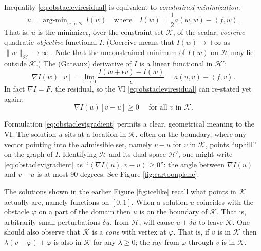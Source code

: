 \documentclass[letterpaper,final,12pt,reqno]{amsart}
\theoremstyle{claim}
\newcommand{\eps}{\epsilon}
\newcommand{\grad}{\nabla}
\newcommand{\ip}[2]{\left<#1,#2\right>}
\numberwithin{equation}{section}
\numberwithin{figure}{section}
\numberwithin{table}{section}
\numberwithin{theorem}{section}
\begin{document}
Inequality \eqref{eq:obstacleviresidual} is equivalent to \emph{constrained minimization}:
\newcommand{\argmin}{\mathop{\mathrm{arg\text{-}min}}}
\begin{equation}
  u = \argmin_{w \text{ in } \mathcal{K}} I(w) \quad \text{where} \quad I(w) = \frac{1}{2} a(w,w) - \ip{f}{w}. \label{eq:obstaclemin}
\end{equation}
That is, $u$ is the minimizer, over the constraint set $\mathcal{K}$, of the scalar, \emph{coercive} quadratic \emph{objective} functional $I$.  (Coercive means that $I(w) \to +\infty$ as $\|w\|_{\mathcal{H}} \to \infty$ \cite{Evans2010}.  Note that the unconstrained minimum of $I(w)$ on $\mathcal{H}$ may lie outside $\mathcal{K}$.)  The (Gateaux) derivative of $I$ is a linear functional in $\mathcal{H}'$:
\begin{equation}
  \grad I(w)[v] = \lim_{\eps\to 0} \frac{I(w+\eps v) - I(w)}{\eps} = a(u,v) - \ip{f}{v}.  \label{eq:gradobjective}
\end{equation}
In fact $\nabla I = F$, the residual, so the VI \eqref{eq:obstacleviresidual} can re-stated yet again:
\begin{equation}
  \nabla I(u)[v-u] \ge 0 \quad \text{ for all } v \text{ in } \mathcal{K}. \label{eq:obstaclevigradient}
\end{equation}

Formulation \eqref{eq:obstaclevigradient} permits a clear, geometrical meaning to the VI.  The solution $u$ sits at a location in $\mathcal{K}$, often on the boundary, where any vector pointing into the admissible set, namely $v-u$ for $v$ in $\mathcal{K}$, points ``uphill'' on the graph of $I$.  Identifying $\mathcal{H}$ and its dual space $\mathcal{H}'$, one might write \eqref{eq:obstaclevigradient} as ``$\ip{\nabla I(u)}{v-u} \ge 0$'': the angle between $\nabla I(u)$ and $v-u$ is at most 90 degrees.  See Figure \ref{fig:cartoonplane}.

The solutions shown in the earlier Figure \ref{fig:icelike} recall what points in $\mathcal{K}$ actually are, namely functions on $[0,1]$.  When a solution $u$ coincides with the obstacle $\varphi$ on a part of the domain then $u$ is on the boundary of $\mathcal{K}$.  That is, arbitrarily-small perturbations $\delta u$, from $\mathcal{H}$, will cause $u+\delta u$ to leave $\mathcal{K}$.  One should also observe that $\mathcal{K}$ is a \emph{cone} with vertex at $\varphi$.  That is, if $v$ is in $\mathcal{K}$ then $\lambda(v-\varphi) + \varphi$ is also in $\mathcal{K}$ for any $\lambda \ge 0$; the ray from $\varphi$ through $v$ is in $\mathcal{K}$.
\end{document}
